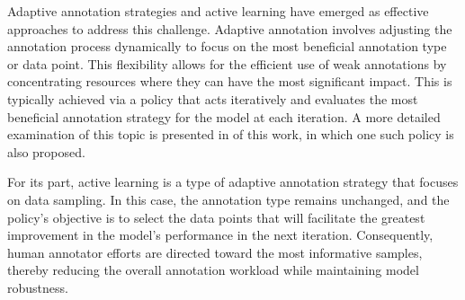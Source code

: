 Adaptive annotation strategies and active learning have emerged as effective approaches to address this challenge. Adaptive annotation involves adjusting the annotation process dynamically to focus on the most beneficial annotation type or data point. This flexibility allows for the efficient use of weak annotations by concentrating resources where they can have the most significant impact. This is typically achieved via a policy that acts iteratively and evaluates the most beneficial annotation strategy for the model at each iteration. A more detailed examination of this topic is presented in  of this work, in which one such policy is also proposed.

For its part, active learning is a type of adaptive annotation strategy that focuses on data sampling. In this case, the annotation type remains unchanged, and the policy's objective is to select the data points that will facilitate the greatest improvement in the model's performance in the next iteration. Consequently, human annotator efforts are directed toward the most informative samples, thereby reducing the overall annotation workload while maintaining model robustness.

